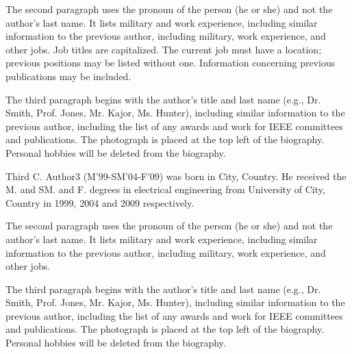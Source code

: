 \documentclass[journal]{IEEEtranTIE}
\begin{document}
{\begin{IEEEbiography}
The second paragraph uses the pronoun of the person (he or she) and not the author's last name. It lists military and work experience, including similar information to the previous author, including military, work experience, and other jobs. Job titles are capitalized. The current job must have a location; previous positions may be listed without one. Information concerning previous publications may be included.

The third paragraph begins with the author's title and last name (e.g., Dr. Smith, Prof. Jones, Mr. Kajor, Ms. Hunter), including similar information to the previous author, including the list of any awards and work for IEEE committees and publications. The photograph is placed at the top left of the biography. Personal hobbies will be deleted from the 
biography.\\ 
\end{IEEEbiography}

\vspace{-2cm}
\begin{IEEEbiography}
{Third C. Author3} (M'99-SM'04-F'09) was born in City, Country. He received the M. and SM. and F. degrees in electrical engineering from University of City, Country in 1999, 2004 and 2009 respectively.

The second paragraph uses the pronoun of the person (he or she) and not the author's last name. It lists military and work experience, including similar information to the previous author, including military, work experience, and other jobs.

The third paragraph begins with the author's title and last name (e.g., Dr. Smith, Prof. Jones, Mr. Kajor, Ms. Hunter), including similar information to the previous author, including the list of any awards and work for IEEE committees and publications. The photograph is placed at the top left of the biography. Personal hobbies will be deleted from the biography.
\\ \\ 
\end{IEEEbiography}

}
\end{document}
